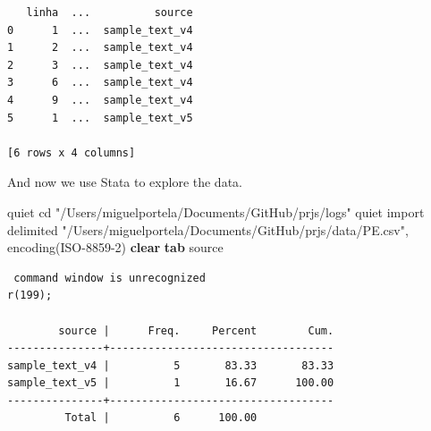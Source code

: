 \documentclass[
  12pt,
]{article}
\newenvironment{Shaded}{\begin{snugshade}}{\end{snugshade}}
\newcommand{\KeywordTok}[1]{\textcolor[rgb]{0.13,0.29,0.53}{\textbf{#1}}}
\newcommand{\NormalTok}[1]{#1}
\newcommand{\StringTok}[1]{\textcolor[rgb]{0.31,0.60,0.02}{#1}}
\begin{document}
\begin{verbatim}
   linha  ...          source
0      1  ...  sample_text_v4
1      2  ...  sample_text_v4
2      3  ...  sample_text_v4
3      6  ...  sample_text_v4
4      9  ...  sample_text_v4
5      1  ...  sample_text_v5

[6 rows x 4 columns]
\end{verbatim}

And now we use Stata to explore the data.

\begin{Shaded}
\begin{Highlighting}[]

\NormalTok{quiet cd }\StringTok{"/Users/miguelportela/Documents/GitHub/prjs/logs"}
\NormalTok{quiet import delimited }\StringTok{"/Users/miguelportela/Documents/GitHub/prjs/data/PE.csv"}\NormalTok{, encoding(ISO-8859-2) }\KeywordTok{clear} 
\KeywordTok{tab}\NormalTok{ source}
\end{Highlighting}
\end{Shaded}

\begin{verbatim}
 command window is unrecognized
r(199);

        source |      Freq.     Percent        Cum.
---------------+-----------------------------------
sample_text_v4 |          5       83.33       83.33
sample_text_v5 |          1       16.67      100.00
---------------+-----------------------------------
         Total |          6      100.00
\end{verbatim}

\begin{Shaded}
\end{Shaded}
\end{document}
